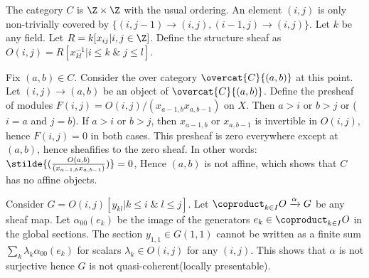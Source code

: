 \begin{example}
The category $C$ is $\Z \times \Z$ with the usual ordering.
An element $(i,j)$ is only non-trivially covered by $\{(i,j-1)\rightarrow (i,j),(i-1,j)\rightarrow (i,j)\}$.
Let $k$ be any field.
Let $R = k[x_{ij}| i,j\in \Z]$. 
Define the structure sheaf as $O(i,j) = R[x_{kl}^{-1}| i\leq k \; \& \; j \leq l]$.

Fix $(a,b) \in C$. 
Consider the over category $\overcat{C}{(a,b)}$ at this point.
Let $(i,j)\rightarrow (a,b)$ be an object of $\overcat{C}{(a,b)}$.
Define the presheaf of modules 
$F(i,j) = O(i,j)/(x_{a-1,b}x_{a,b-1})$ on $X$.
Then $a > i$ or $b > j$ or ($i=a$ and $j=b$).
If $a>i$ or $b>j$, then $x_{a-1,b}$ or $x_{a,b-1}$ is invertible in $O(i,j)$, 
hence $F(i,j) = 0$ in both cases.
This presheaf is zero everywhere except at $(a,b)$,
hence sheafifies to the zero sheaf.
In other words: $\stilde{(\frac{O(a,b)}{(x_{a-1,b}x_{a,b-1})})} = 0$,
Hence $(a,b)$ is not affine,
which shows that $C$ has no affine objects.

Consider $G = O(i,j)[y_{kl}| k\leq i \; \& \; l \leq j]$. 
Let $\coproduct_{k\in I} O \xrightarrow{\alpha} G$ be any sheaf map.
Let $\alpha_{00}(e_k)$ be the image of the generators $e_k\in \coproduct_{k\in I} O$ in the global sections. 
The section $y_{1,1}\in G(1,1)$ cannot be written as a finite sum $\sum_k \lambda_k \alpha_{00}(e_k)$ 
for scalars $\lambda_k\in O(i,j)$ for any $(i,j)$.
This shows that $\alpha$ is not surjective hence $G$ is not quasi-coherent(locally presentable).
\end{example}